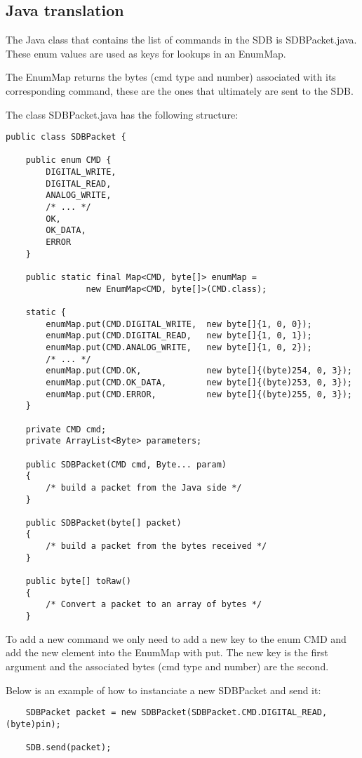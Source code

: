 \documentclass[12pt,a4paper]{report}
\begin{document}
\subsection*{Java translation}
The Java class that contains the list of commands in the SDB is SDBPacket.java. These enum values are used as keys for lookups in an EnumMap.

The EnumMap returns the bytes (cmd type and number) associated with its corresponding command, these are the ones that ultimately are sent to the SDB.

The class SDBPacket.java has the following structure:

\begin{lstlisting}
public class SDBPacket {

    public enum CMD {
        DIGITAL_WRITE,
        DIGITAL_READ,
        ANALOG_WRITE,
        /* ... */
        OK,
        OK_DATA,
        ERROR
    }
    
    public static final Map<CMD, byte[]> enumMap =
                new EnumMap<CMD, byte[]>(CMD.class);
    
    static {
        enumMap.put(CMD.DIGITAL_WRITE,  new byte[]{1, 0, 0});
        enumMap.put(CMD.DIGITAL_READ,   new byte[]{1, 0, 1});
        enumMap.put(CMD.ANALOG_WRITE,   new byte[]{1, 0, 2});
        /* ... */
        enumMap.put(CMD.OK,             new byte[]{(byte)254, 0, 3});
        enumMap.put(CMD.OK_DATA,        new byte[]{(byte)253, 0, 3});
        enumMap.put(CMD.ERROR,          new byte[]{(byte)255, 0, 3});
    }

    private CMD cmd;
    private ArrayList<Byte> parameters;
    
    public SDBPacket(CMD cmd, Byte... param)
    {
        /* build a packet from the Java side */
    }
    
    public SDBPacket(byte[] packet)
    {
        /* build a packet from the bytes received */  
    }
    
    public byte[] toRaw()
    {
        /* Convert a packet to an array of bytes */
    }
\end{lstlisting}

To add a new command we only need to add a new key to the enum CMD and add the new element into the EnumMap with put. The new key is the first argument and the associated bytes (cmd type and number) are the second.

Below is an example of how to instanciate a new SDBPacket and send it:

\begin{lstlisting}
    SDBPacket packet = new SDBPacket(SDBPacket.CMD.DIGITAL_READ,(byte)pin);
    
    SDB.send(packet);
\end{lstlisting}
\end{document}
